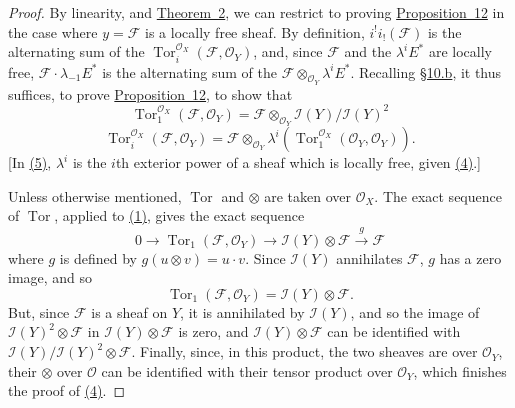 \documentclass{article}
\theoremstyle{plain}
\theoremstyle{definition}
\newcommand{\scr}[1]{{\mathscr{#1}}}
\DeclareMathOperator{\Tor}{Tor}
\newcommand{\oldpage}[1]{\marginpar{\footnotesize$\Big\vert$ \textit{p.~#1}}}
\begin{document}
\begin{proof}
  By linearity, and \hyperref[theorem2]{Theorem~2}, we can restrict to proving \hyperref[proposition12]{Proposition~12} in the case where $y=\scr{F}$ is a locally free sheaf.
  By definition, $i^!i_!(\scr{F})$ is the alternating sum of the $\Tor_i^{\scr{O}_X}(\scr{F},\scr{O}_Y)$, and, since $\scr{F}$ and the $\lambda^i E^*$ are locally free, $\scr{F}\cdot\lambda_{-1}E^*$ is the alternating sum of the $\scr{F}\otimes_{\scr{O}_Y}\lambda^i E^*$.
  Recalling \hyperref[subsection10b]{\S10.b}, it thus suffices, to prove \hyperref[proposition12]{Proposition~12}, to show that
  \[
  \label{equation4}
    \Tor_1^{\scr{O}_X}(\scr{F},\scr{O}_Y)
    = \scr{F} \otimes_{\scr{O}_Y} \scr{I}(Y)/\scr{I}(Y)^2
    \tag{4}
  \]
  \[
  \label{equation5}
    \Tor_i^{\scr{O}_X}(\scr{F},\scr{O}_Y)
    = \scr{F} \otimes_{\scr{O}_Y} \lambda^i(\Tor_1^{\scr{O}_X}(\scr{O}_Y,\scr{O}_Y)).
    \tag{5}
  \]
  [In \hyperref[equation5]{(5)}, $\lambda^i$ is the $i$th exterior power of a sheaf which is locally free, given \hyperref[equation4]{(4)}.]

  Unless otherwise mentioned, $\Tor$ and $\otimes$ are taken over $\scr{O}_X$.
  The exact sequence of $\Tor$, applied to \hyperref[section10aequation1]{(1)}, gives the exact sequence
  \[
    0 \to \Tor_1(\scr{F},\scr{O}_Y) \to \scr{I}(Y)\otimes\scr{F} \xrightarrow{g} \scr{F}
  \]
  where $g$ is defined by $g(u\otimes v)=u\cdot v$.
  Since $\scr{I}(Y)$ annihilates $\scr{F}$, $g$ has a zero image, and so
  \[
    \Tor_1(\scr{F},\scr{O}_Y) = \scr{I}(Y)\otimes\scr{F}.
  \]
  But, since $\scr{F}$ is a sheaf on $Y$, it is annihilated by $\scr{I}(Y)$, and so the image of $\scr{I}(Y)^2\otimes\scr{F}$ in $\scr{I}(Y)\otimes\scr{F}$ is zero, and $\scr{I}(Y)\otimes\scr{F}$ can be identified with $\scr{I}(Y)/\scr{I}(Y)^2\otimes\scr{F}$.
  Finally, since, in this product, the two sheaves are
\oldpage{123}
  over $\scr{O}_Y$, their $\otimes$ over $\scr{O}$ can be identified with their tensor product over $\scr{O}_Y$, which finishes the proof of \hyperref[equation4]{(4)}.


\end{proof}
\end{document}
